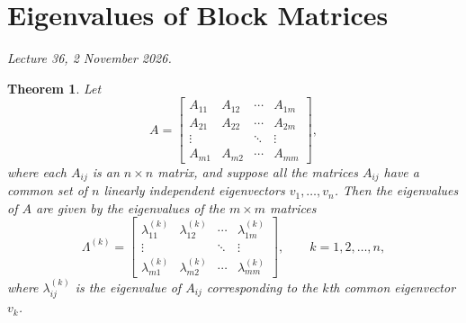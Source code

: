 \documentclass[11pt,a4paper]{article}
\numberwithin{equation}{section}
\theoremstyle{spacedplain}
\newtheorem{theorem}{Theorem}[section]
\theoremstyle{spaceddefinition}
\theoremstyle{spacedremark}
\newcommand{\lecinfo}[1]{\noindent\textit{#1}\par}
\begin{document}
\section{Eigenvalues of Block Matrices}

\lecinfo{Lecture 36, 2 November 2026.}

\begin{keybox}
\begin{theorem}\label{thm:block}
Let
\[
  A=\begin{bmatrix}
    A_{11}&A_{12}&\cdots&A_{1m}\\
    A_{21}&A_{22}&\cdots&A_{2m}\\
    \vdots&&\ddots&\vdots\\
    A_{m1}&A_{m2}&\cdots&A_{mm}
  \end{bmatrix},
\]
where each \(A_{ij}\) is an \(n\times n\) matrix, and suppose all the
matrices \(A_{ij}\) have a common set of \(n\) linearly independent
eigenvectors \(v_1,\dots,v_n\).  Then the eigenvalues of \(A\) are
given by the eigenvalues of the \(m\times m\) matrices
\[
  \Lambda^{(k)}=
  \begin{bmatrix}
    \lambda_{11}^{(k)}&\lambda_{12}^{(k)}&\cdots&\lambda_{1m}^{(k)}\\
    \vdots&&\ddots&\vdots\\
    \lambda_{m1}^{(k)}&\lambda_{m2}^{(k)}&\cdots&\lambda_{mm}^{(k)}
  \end{bmatrix},
  \qquad k=1,2,\dots,n,
\]
where \(\lambda_{ij}^{(k)}\) is the eigenvalue of \(A_{ij}\)
corresponding to the \(k\)th common eigenvector \(v_k\).
\end{theorem}
\end{keybox}
\end{document}
